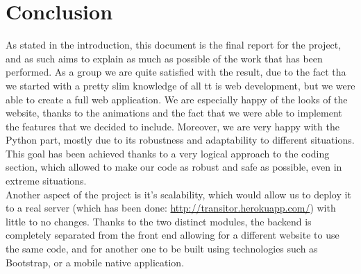 \documentclass[a4paper]{article}
\begin{document}
\section{Conclusion}
As stated in the introduction, this document is the final report for the project, and as such aims to explain as much as possible of the work that has been performed. As a group we are quite satisfied with the result, due to the fact tha we started with a pretty slim knowledge of all tt is web development, but we were able to create a full web application. We are especially happy of the looks of the website, thanks to the animations and the fact that we were able to implement the features that we decided to include. Moreover, we are very happy with the Python part, mostly due to its robustness and adaptability to different situations. This goal has been achieved thanks to a very logical approach to the coding section, which allowed to make our code as robust and safe as possible, even in extreme situations. \\

Another aspect of the project is it's scalability, which would allow us to deploy it to a real server (which has been done: \url{http://transitor.herokuapp.com/}) with little to no changes. Thanks to the two distinct modules, the backend is completely separated from the front end allowing for a different website to use the same code, and for another one to be built using technologies such as Bootstrap, or a mobile native application. 
\end{document}
